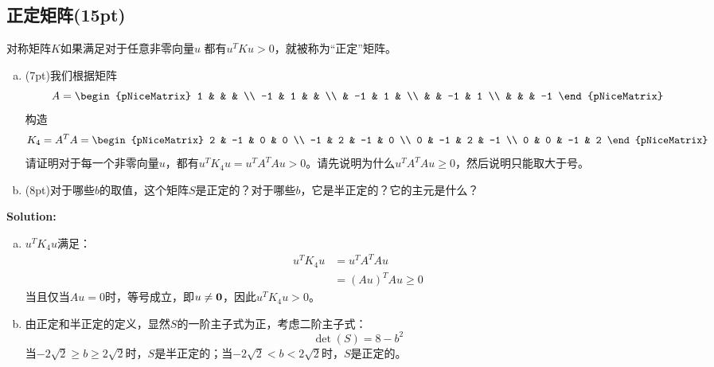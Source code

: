 \documentclass[12pt, a4paper, oneside]{article}
\begin{document}
\clearpage

\subsection{正定矩阵(15pt)}
对称矩阵$K$如果满足对于任意非零向量$u$ 都有$u^TKu > 0$，就被称为“正定”矩阵。
\begin{enumerate}[(a)]
    \item (7pt)我们根据矩阵
    $$A = \begin{pNiceMatrix}
        1 &  & & \\ -1 & 1 & & \\ & -1 & 1 & \\ & & -1 & 1 \\ & & & -1
    \end{pNiceMatrix}$$
    构造
    $$K_4 = A^T A = \begin{pNiceMatrix}
        2 & -1 & 0 & 0 \\ -1 & 2 & -1 & 0 \\ 0 & -1 & 2 & -1 \\ 0 & 0 & -1 & 2
    \end{pNiceMatrix}$$
    请证明对于每一个非零向量$u$，都有$u^TK_4u=u^TA^TAu>0$。请先说明为什么$u^TA^TAu\ge 0$，然后说明只能取大于号。
    \item (8pt)对于哪些$b$的取值，这个矩阵$S$是正定的？对于哪些$b$，它是半正定的？它的主元是什么？
\end{enumerate}
\textbf{Solution:}
\begin{enumerate}[(a)]
    \item $u^TK_4u$满足：
    \begin{align*}
        u^TK_4u &= u^TA^TAu \\
                &= (Au)^TAu \ge 0
    \end{align*}
    当且仅当$Au=0$时，等号成立，即$u\neq\textbf{0}$，因此$u^TK_4u>0$。
    \item 由正定和半正定的定义，显然$S$的一阶主子式为正，考虑二阶主子式：
    $$\det(S) = 8 - b^2$$
    当$-2\sqrt{2} \ge b \ge 2\sqrt{2}$时，$S$是半正定的；当$-2\sqrt{2} < b < 2\sqrt{2}$时，$S$是正定的。
\end{enumerate}
\end{document}
